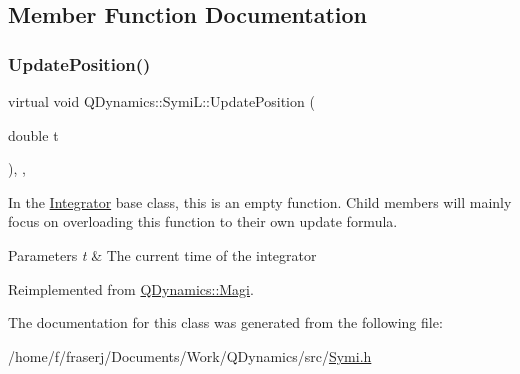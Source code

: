 \subsection{Member Function Documentation}
\mbox{\label{classQDynamics_1_1SymiL_a28d23793abeb8f40c9d9ec069d67debb}} 
\subsubsection{\texorpdfstring{Update\+Position()}{UpdatePosition()}}
{\footnotesize\ttfamily virtual void Q\+Dynamics\+::\+Symi\+L\+::\+Update\+Position (\begin{DoxyParamCaption}\item[{double}]{t }\end{DoxyParamCaption})\hspace{0.3cm}{\ttfamily [inline]}, {\ttfamily [private]}, {\ttfamily [virtual]}}



In the \hyperlink{classQDynamics_1_1Integrator}{Integrator} base class, this is an empty function. Child members will mainly focus on overloading this function to their own update formula. 


\begin{DoxyParams}{Parameters}
{\em t} & The current time of the integrator \\
\hline
\end{DoxyParams}


Reimplemented from \hyperlink{classQDynamics_1_1Magi_a500467f899244edfae15f34c84c7684c}{Q\+Dynamics\+::\+Magi}.



The documentation for this class was generated from the following file\+:\begin{DoxyCompactItemize}
\item 
/home/f/fraserj/\+Documents/\+Work/\+Q\+Dynamics/src/\hyperlink{Symi_8h}{Symi.\+h}\end{DoxyCompactItemize}
